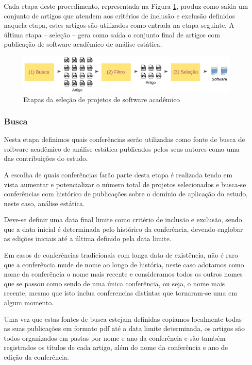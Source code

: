 Cada etapa deste procedimento, representada na Figura
\ref{etapas-selecao-software}, produz como saída um conjunto de artigos que
atendem aos critérios de inclusão e exclusão definidos naquela etapa, estes
artigos são utilizados como entrada na etapa seguinte. A última etapa --
seleção -- gera como saída o conjunto final de artigos com publicação de
software acadêmico de análise estática.

\begin{figure}[h]
  \center
  \includegraphics[scale=0.21]{imagens/etapas-selecao-software.png}
  \caption{Etapas da seleção de projetos de software acadêmico}
  \label{etapas-selecao-software}
\end{figure}

\subsubsection{Busca}

Nesta etapa definimos quais conferências serão utilizadas como fonte de busca
de software acadêmico de análise estática publicados pelos seus autores como
uma das contribuições do estudo.

A escolha de quais conferências farão parte desta etapa é realizada tendo em
vista aumentar e potencializar o número total de projetos selecionados e
busca-se conferências com histórico de publicações sobre o domínio de aplicação
do estudo, neste caso, análise estática.

Deve-se definir uma data final limite como critério de inclusão e exclusão,
sendo que a data inicial é determinada pelo histórico da conferência, devendo
englobar as edições iniciais até a última definido pela data limite.

Em casos de conferências tradicionais com longa data de existência, não é raro
que a conferência mude de nome ao longo de história, neste caso adotamos como
nome da conferência o nome mais recente e consideramos todos os outros nomes
que se passou como sendo de uma única conferência, ou seja, o nome mais
recente, mesmo que isto inclua conferencias distintas que tornaram-se uma em
algum momento.

Uma vez que estas fontes de busca estejam definidas copiamos localmente todas
as suas publicações em formato pdf até a data limite determinada, os artigos
são todos organizados em pastas por nome e ano da conferência e são também
registrados os títulos de cada artigo, além do nome da conferência e ano de
edição da conferência.

